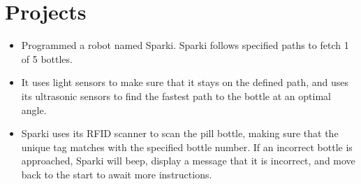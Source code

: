\documentclass[10pt,a4paper,sans]{moderncv} %
\begin{document}
\section {Projects}
\vspace{-1mm}
\begin{itemize}
\vspace{-6mm}
\item{Programmed a robot named Sparki. Sparki follows specified paths to fetch 1 of 5 bottles.} 
\item{It uses light sensors to make sure that it stays on the defined path, and uses its ultrasonic sensors to find the fastest path to the bottle at an optimal angle.} 
\item{Sparki uses its RFID scanner to scan the pill bottle, making sure that the unique tag  matches with the specified bottle number. If an incorrect bottle is approached, Sparki will beep, display a message that it is incorrect, and move back to the start to await more instructions.}
\end{itemize}
\end{document}
